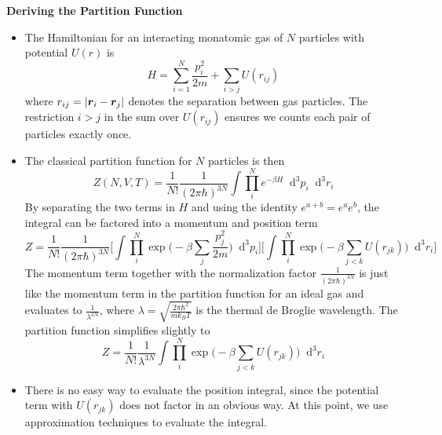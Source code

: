 \documentclass[11pt, a4paper]{article}
\newcommand{\diff}{\mathop{}\!\mathrm{d}} %
\begin{document}
\textbf{Deriving the Partition Function}
\begin{itemize}
	\item The Hamiltonian for an interacting monatomic gas of $ N $ particles with potential $ U(r) $ is
	\begin{equation*}
		H = \sum_{i=1}^{N} \frac{p_{i}^{2}}{2m} + \sum_{i>j}U(r_{ij})
	\end{equation*}
	where $ r_{ij} = \abs{\bm{r}_{i} - \bm{r}_{j}}$ denotes the separation between gas particles. The restriction $ i > j $ in the sum over $ U(r_{ij}) $ ensures we counts each pair of particles exactly once.
	
	\item The classical partition function for $ N $ particles is then
	\begin{equation*}
		Z(N, V, T) = \frac{1}{N!}\frac{1}{(2\pi \hbar)^{3N}} \int \prod_{i}^{N}e^{-\beta H} \diff^{3} p_{i} \diff^{3} r_{i} 
	\end{equation*}
	By separating the two terms in $ H $ and using the identity $ e^{a + b} = e^{a}e^{b} $, the integral can be factored into a momentum and position term
	\begin{equation*}
		\textstyle{Z = \frac{1}{N!}\frac{1}{(2\pi \hbar)^{3N}} \Big[\int \prod_{i}^{N} \exp \Big(-\beta \sum_{j} \frac{p_{j}^{2}}{2m}\Big) \diff^{3} p_{i}\Big] \Big[\int \prod_{i}^{N}\exp\Big(-\beta \sum_{j < k}U(r_{jk})\Big) \diff^{3} r_{i} \Big]}
	\end{equation*}
	The momentum term together with the normalization factor $ \frac{1}{(2\pi \hbar)^{3N}} $ is just like the momentum term in the partition function for an ideal gas and evaluates to $ \frac{1}{\lambda^{3N}} $, where $ \lambda = \sqrt{\frac{2\pi \hbar^{2}}{mk_{B}T}} $ is the thermal de Broglie wavelength. The partition function simplifies slightly to
	\begin{equation*}
		Z = \frac{1}{N!}\frac{1}{\lambda^{3N}} \int \prod_{i}^{N}\exp \bigg (-\beta \sum_{j < k}U(r_{jk})\bigg ) \diff^{3} r_{i} 
	\end{equation*}
	
	\item There is no easy way to evaluate the position integral, since the potential term with $ U(r_{jk}) $ does not factor in an obvious way. At this point, we use approximation techniques to evaluate the integral.
	

\end{itemize}
\end{document}
